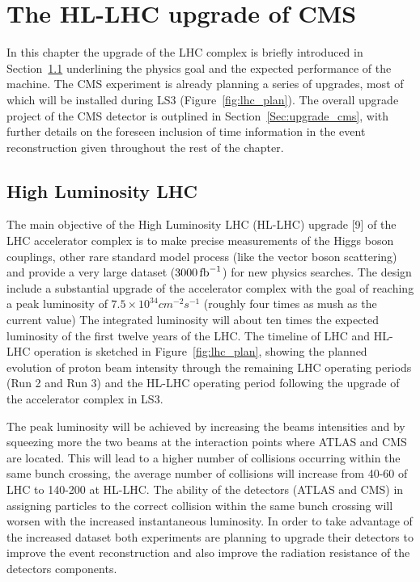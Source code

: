 \providecommand{\sixbysix}{\ensuremath{6\times 6\mathrm{~cm}^{2}}\xspace}
\providecommand{\threebythree}{\ensuremath{3\times 3\mathrm{~cm}^{2}}\xspace}
\providecommand{\twobytwo}{\ensuremath{2\times 2\mathrm{~cm}^{2}}\xspace}
\providecommand{\onebyone}{\ensuremath{1\times 1\mathrm{~cm}^{2}}\xspace}
\providecommand{\relChIso}{\ensuremath{Ch_{iso}/p_T^{muon}}}

\chapter{The HL-LHC upgrade of CMS}
\label{chapter:upgrade}

In this chapter the upgrade of the LHC complex is briefly introduced in Section~\ref{upgrade_lhc}
underlining the physics goal and the expected performance of the machine. The CMS experiment is already planning
a series of upgrades, most of which will be installed during LS3 (Figure~\ref{fig:lhc_plan}).
The overall upgrade project of the CMS detector is outplined in Section~\ref{Sec:upgrade_cms}, with further details on the
foreseen inclusion of time information in the event reconstruction given throughout the rest of the chapter.

\section{High Luminosity LHC}
\label{upgrade_lhc}

The main objective of the High Luminosity LHC (HL-LHC) upgrade [9] of the LHC accelerator complex
is to make precise measurements of the Higgs boson couplings, other rare standard model process (like the vector boson scattering)
and provide a very large dataset ($3000\mathrm{\,fb}^{-1}$) for new physics searches.
The design include a substantial upgrade of the accelerator complex with the goal of reaching
a peak luminosity of $7.5\times10^{34} cm^{-2}s^{-1}$ (roughly four times as mush as the current value)
The integrated luminosity will about ten times the expected luminosity of the first twelve
years of the LHC.
The timeline of LHC and HL-LHC operation is sketched in Figure~\ref{fig:lhc_plan}, showing the planned
evolution of proton beam intensity through the remaining LHC operating periods (Run 2 and Run 3)
and the HL-LHC operating period following the upgrade of the accelerator complex in LS3.

The peak luminosity will be achieved by increasing the beams intensities and by squeezing more the two beams at the
interaction points where ATLAS and CMS are located.
This will lead to a higher number of collisions occurring within the same bunch crossing, the
average number of collisions will increase from 40-60 of LHC to 140-200 at HL-LHC.
The ability of the detectors (ATLAS and CMS) in assigning particles to the correct collision within the same bunch crossing
will worsen with the increased instantaneous luminosity. In order to take advantage of the increased dataset
both experiments are planning to upgrade their detectors to improve the event reconstruction and also improve
the radiation resistance of the detectors components.

